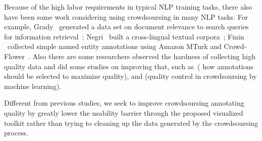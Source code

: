 Because of the high labor requirements in typical NLP training tasks,
there also have been some work considering using crowdsoursing in many
NLP tasks. For example, Grady \etal\ generated a data set on document
relevance to search queries for information
retrieval~\cite{Grady2010CDR18666961866723}; Negri \etal\ built a
cross-lingual textual corpora~\cite{Negri2011DCC21454322145510};
Finin \etal\ collected simple named entity annotations using Amazon MTurk
and Crowd-Flower~\cite{Finin2010ANE18666961866709}. Also there are
some researchers observed the hardness of collecting high quality data
and did some studies on improving that, such
as~\cite{Hsueh2009DQC15641311564137}( how annotations should be
selected to maximize quality), and \cite{lease2011quality} (quality
control in crowdsoursing by machine learning).

Different from previous studies, we seek to improve crowdsoursing
annotating quality by greatly lower the usability barrier through the
proposed visualized toolkit rather than trying to cleaning up the data
generated by the crowdsoursing process.
